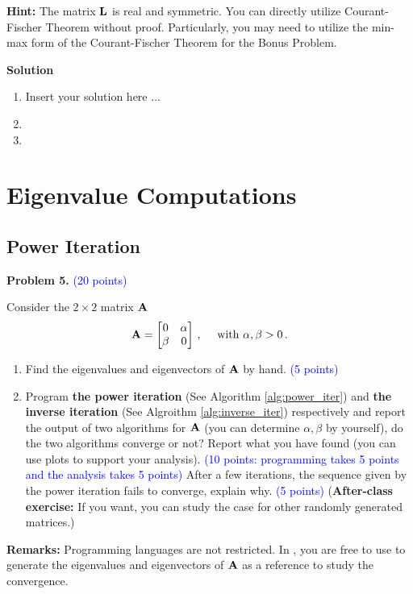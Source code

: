 \documentclass[english,onecolumn]{IEEEtran}
\newcommand{\bA}{{\bf A}}
\newcommand{\bL}{{\bf L}}
\begin{document}
\noindent\textbf{Hint:} 
The matrix $\bL$ is real and symmetric. 
	You can directly utilize Courant-Fischer Theorem without proof. Particularly, you may need to utilize the min-max form of the Courant-Fischer Theorem for the Bonus Problem.


\noindent
\textbf{Solution}
\begin{enumerate}
    \item Insert your solution here ...
    \item
    \item
\end{enumerate}


\newpage

\section{Eigenvalue Computations}
\subsection{Power Iteration} 
\noindent
\textbf{Problem 5.}
\textcolor{blue}{(20 points)}

Consider the $2\times 2$ matrix $\bA$
\[
\bA = \begin{bmatrix}
	0 & \alpha \\
	\beta & 0
\end{bmatrix}\,,\quad \text{ with }\alpha,\beta > 0\,.
\]
\begin{enumerate}
    \item Find the eigenvalues and eigenvectors of $\bA$ by hand. \textcolor{blue}{(5 points)}
    \item Program \textbf{the power iteration} (See Algorithm \ref{alg:power_iter}) and \textbf{the inverse iteration} (See Algroithm \ref{alg:inverse_iter}) respectively and report the output of two algorithms for $\bA$ (you can determine $\alpha,\beta$ by yourself), do the two algorithms converge or not? Report what you have found (you can use plots to support your analysis). \textcolor{blue}{(10 points: programming takes 5 points and the analysis takes 5 points)}
    After a few iterations, the sequence given by the power iteration fails to converge, explain why. \textcolor{blue}{(5 points)}
    (\textbf{After-class exercise:} If you want, you can study the case for other randomly generated matrices.)
\end{enumerate}
\textbf{Remarks:}
Programming languages are not restricted. In , you are free to use  to generate the eigenvalues and eigenvectors of $\bA$ as a reference to study  the convergence.
\end{document}

